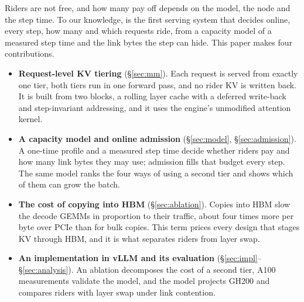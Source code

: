 Riders are not free, and how many pay off depends on the model, the node and
the step time. To our knowledge, \sysname{} is the first serving system that
decides online, every step, how many and which requests ride, from a capacity
model of a measured step time and the link bytes the step can hide. This paper
makes four contributions.
\begin{itemize}\itemsep1pt
\item \textbf{Request-level KV tiering} (\S\ref{sec:mm}). Each request is
  served from exactly one tier, both tiers run in one forward pass, and no
  rider KV is written back. It is built from two blocks, a rolling layer cache
  with a deferred write-back and step-invariant addressing, and it uses the
  engine's unmodified attention kernel.
\item \textbf{A capacity model and online admission} (\S\ref{sec:model},
  \S\ref{sec:admission}). A one-time profile and a measured step time decide
  whether riders pay and how many link bytes they may use; admission fills
  that budget every step. The same model ranks the four ways of using a
  second tier and shows which of them can grow the batch.
\item \textbf{The cost of copying into HBM} (\S\ref{sec:ablation}). Copies into
  HBM slow the decode GEMMs in proportion to their traffic, about four times
  more per byte over PCIe than for bulk copies. This term prices every design
  that stages KV through HBM, and it is what separates riders from layer swap.
\item \textbf{An implementation in vLLM and its evaluation}
  (\S\ref{sec:impl}--\S\ref{sec:analysis}). An ablation decomposes the cost of
  a second tier, A100 measurements validate the model, and the model projects
  GH200 and compares riders with layer swap under link contention.
\end{itemize}
